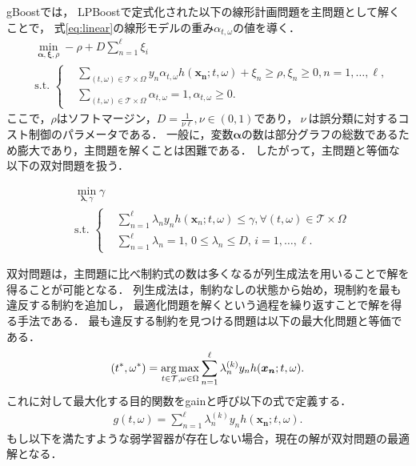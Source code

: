 gBoostでは，
LPBoostで定式化された以下の線形計画問題を主問題として解くことで，
式\eqref{eq:linear}の線形モデルの重み$\alpha_{t,\omega}$の値を導く．
\begin{align}
	&\min_{\bm{\alpha},\bm{\xi},\rho} -\rho + D \sum_{n=1}^{\ell} \xi_{i} \nonumber\\
	&\text{s.t.} \,\,\left\{
	\begin{aligned}
		&\sum_{(t,\omega) \in \mathcal{T} \times \Omega} y_{n} \alpha_{t,\omega} h(\bm{x_{n}};t,\omega) + \xi_{n} \geq \rho,
		\xi_{n} \geq 0,	n = 1, \dots , \ell,\nonumber \\
		&\sum_{(t,\omega) \in \mathcal{T} \times \Omega} \alpha_{t, \omega} = 1, \alpha_{t, \omega} \geq 0.
	\end{aligned}\right.
\end{align}
ここで，$\rho$はソフトマージン，$D=\frac{1}{\nu \ell}, \nu \in (0,1)$であり，$\ \nu\ $は誤分類に対するコスト制御のパラメータである．
一般に，変数$\bm{\alpha}$の数は部分グラフの総数であるため膨大であり，主問題を解くことは困難である．
したがって，主問題と等価な以下の双対問題を扱う．

\begin{align}
	\label{eq:dualprob}
	&\min_{\bm{\lambda},\gamma} \gamma \nonumber\\
	&\text{s.t.} \,\,\left\{
	\begin{aligned}
		& \sum_{n=1}^{\ell} \lambda_{n} y_{n} h(\bm{x}_{n};t,\omega) \leq \gamma,
		\forall(t,\omega) \in \mathcal{T} \times \Omega\\
		& \sum_{n=1}^{\ell} \lambda_{n} = 1, \,0 \leq \lambda_{n} \leq D, \,i = 1, \dots , \ell. 
	\end{aligned}\right. \end{align}

双対問題は，主問題に比べ制約式の数は多くなるが列生成法を用いることで解を得ることが可能となる．
列生成法は，制約なしの状態から始め，現制約を最も違反する制約を追加し，
最適化問題を解くという過程を繰り返すことで解を得る手法である．
最も違反する制約を見つける問題は以下の最大化問題と等価である．
\begin{equation*}
	(t^{*}, \omega^{*}) = \operatorname*{arg\,max}_{t \in \mathcal{T} , \omega \in \Omega} \sum_{n=1}^{\ell} \lambda_{n}^{(k)} y_{n} h(\bm{x_{n}} ; t, \omega).
\end{equation*}
これに対して最大化する目的関数をgainと呼び以下の式で定義する．
\begin{align}
	\label{eq:gain}
	g(t, \omega) = \sum_{n=1}^{\ell} \lambda_{n}^{(k)} y_{n} h(\bm{x_{n}} ; t, \omega).
\end{align}
もし以下を満たすような弱学習器が存在しない場合，現在の解が双対問題の最適解となる．

